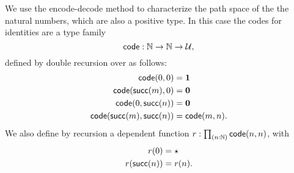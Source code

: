 %
%
We use the encode-decode method to characterize the path space of the the natural numbers, which are also a positive type.
In this case the codes for identities are a type family
\[\mathsf{code}:\mathbb{N}\to\mathbb{N}\to\mathcal{U},\]
defined by double recursion over \N as follows:
\begin{align*}
  \mathsf{code}(0,0) &= \mathbf{1}\\
  \mathsf{code}(\mathsf{succ}(m),0) &= \mathbf{0}\\
  \mathsf{code}(0,\mathsf{succ}(n)) &= \mathbf{0}\\
  \mathsf{code}(\mathsf{succ}(m),\mathsf{succ}(n)) &= \mathsf{code}(m,n).
\end{align*}
We also define by recursion a dependent function $r:\prd{n:\N} \code(n,n)$, with
\begin{align*}
  r(0) &= \star\\
  r(\mathsf{succ}(n)) &= r(n).
\end{align*}

